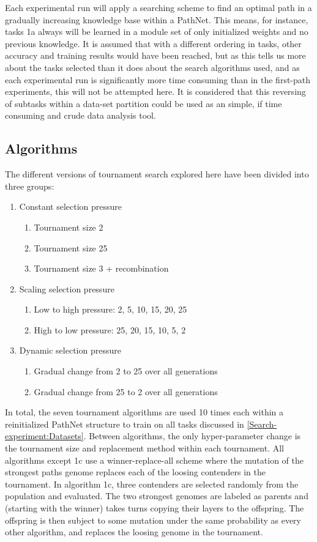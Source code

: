 Each experimental run will apply a searching scheme to find an optimal path in a gradually increasing knowledge base within a PathNet. This means, for instance, tasks 1a always will be learned in a module set of only initialized weights and no previous knowledge. It is assumed that with a different ordering in tasks, other  accuracy and training results would have been reached, but as this tells us more about the tasks selected than it does about the search algorithms used, and as each experimental run is significantly more time consuming than in the first-path experiments, this will not be attempted here. It is considered that this reversing of subtasks within a data-set partition could be used as an simple, if time consuming and crude data analysis tool.

\subsection{Algorithms}\label{Search-experiment:Algorithms}
The different versions of tournament search explored here have been divided into three groups: 
\begin{enumerate}
    \item Constant selection pressure
    \begin{enumerate}
        \item Tournament size 2
        \item Tournament size 25
        \item Tournament size 3 + recombination
    \end{enumerate}
    \item Scaling selection pressure
    \begin{enumerate}
        \item Low to high pressure: 2, 5, 10, 15, 20, 25
        \item High to low pressure: 25, 20, 15, 10, 5, 2
    \end{enumerate}
    \item Dynamic selection pressure
    \begin{enumerate}
        \item Gradual change from 2 to 25 over all generations
        \item Gradual change from 25 to 2 over all generations
    \end{enumerate}
\end{enumerate}
In total, the seven tournament algorithms are used 10 times each within a reinitialized PathNet structure to train on all tasks discussed in \ref{Search-experiment:Datasets}. Between algorithms, the only hyper-parameter change is the tournament size and replacement method within each tournament. All algorithms except 1c use a winner-replace-all scheme where the mutation of the strongest paths genome replaces each of the loosing contenders in the tournament. In algorithm 1c, three contenders are selected randomly from the population and evaluated. The two strongest genomes are labeled as parents and (starting with the winner) takes turns copying their layers to the offspring. The offspring is then subject to some mutation under the same probability as every other algorithm, and replaces the loosing genome in the tournament.
